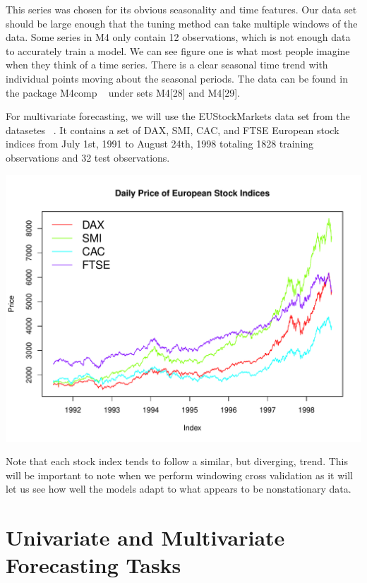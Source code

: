 \documentclass{article}\usepackage[]{graphicx}\usepackage[]{color}
\makeatletter
\def\maxwidth{ %
  \ifdim\Gin@nat@width>\linewidth
    \linewidth
  \else
    \Gin@nat@width
  \fi
}
\newenvironment{knitrout}{}{} %
\theoremstyle{definition}
\newcommand\code{\@codex}
\def\@codex#1{{\normalfont\ttfamily\hyphenchar\font=-1 #1}}
\newcommand{\pkg}[1]{{\fontseries{b}\selectfont #1}}
\makeatother
\begin{document}
This series was chosen for its obvious seasonality and time features. Our data set should be large enough that the tuning method can take multiple windows of the data. Some series in M4 only contain 12 observations, which is not enough data to accurately train a model. We can see figure one is what most people imagine when they think of a time series. There is a clear seasonal time trend with individual points moving about the seasonal periods. The data can be found in the package \pkg{M4comp} ~\cite{m4comp} under sets \code{M4[28]} and \code{M4[29]}. 

For multivariate forecasting, we will use the EUStockMarkets data set from the \pkg{datasetes} ~\cite{datasets}. It contains a set of DAX, SMI, CAC, and FTSE European stock indices from July 1st, 1991 to August 24th, 1998 totaling 1828 training observations and 32 test observations.

\begin{knitrout}
\color{fgcolor}

{\centering \includegraphics[width=\maxwidth]{figure/get_dat_stocks-1} 

}



\end{knitrout}

Note that each stock index tends to follow a similar, but diverging, trend. This will be important to note when we perform windowing cross validation as it will let us see how well the models adapt to what appears to be nonstationary data.

\section{Univariate and Multivariate Forecasting Tasks}
\label{sec:task}
\end{document}
